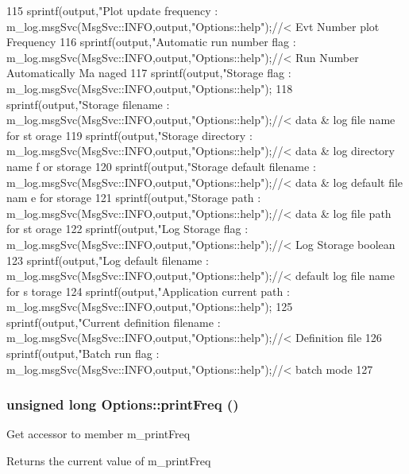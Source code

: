 \begin{DoxyCode}
{115   sprintf(output,"Plot update frequency       : %
      m_log.msgSvc(MsgSvc::INFO,output,"Options::help");//< Evt Number plot Frequency
116   sprintf(output,"Automatic run number flag   : %
      m_log.msgSvc(MsgSvc::INFO,output,"Options::help");//< Run Number Automatically Ma
      naged
117   sprintf(output,"Storage flag                : %
      m_log.msgSvc(MsgSvc::INFO,output,"Options::help");
118   sprintf(output,"Storage filename            : %
      m_log.msgSvc(MsgSvc::INFO,output,"Options::help");//< data & log file name for st
      orage
119   sprintf(output,"Storage directory           : %
      m_log.msgSvc(MsgSvc::INFO,output,"Options::help");//< data & log directory name f
      or storage
120   sprintf(output,"Storage default filename    : %
      m_log.msgSvc(MsgSvc::INFO,output,"Options::help");//< data & log default file nam
      e for storage
121   sprintf(output,"Storage path                : %
      m_log.msgSvc(MsgSvc::INFO,output,"Options::help");//< data & log file path for st
      orage
122   sprintf(output,"Log Storage flag            : %
      m_log.msgSvc(MsgSvc::INFO,output,"Options::help");//< Log Storage boolean
123   sprintf(output,"Log default filename        : %
      m_log.msgSvc(MsgSvc::INFO,output,"Options::help");//< default log file name for s
      torage
124   sprintf(output,"Application current path    : %
      m_log.msgSvc(MsgSvc::INFO,output,"Options::help");
125   sprintf(output,"Current definition filename : %
      m_log.msgSvc(MsgSvc::INFO,output,"Options::help");//< Definition file
126   sprintf(output,"Batch run flag              : %
      m_log.msgSvc(MsgSvc::INFO,output,"Options::help");//< batch mode
127 }
\end{DoxyCode}
\hypertarget{classOptions_a67021ffef9f666bba4696f89807b2a70}{
\subsubsection[{printFreq}]{\setlength{\rightskip}{0pt plus 5cm}unsigned long Options::printFreq ()}}
\label{classOptions_a67021ffef9f666bba4696f89807b2a70}
Get accessor to member m\_\-printFreq \begin{DoxyReturn}{Returns}
the current value of m\_\-printFreq 
\end{DoxyReturn}


